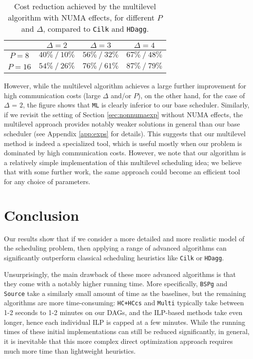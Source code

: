 \documentclass[sigconf,nonacm]{acmart}
\begin{document}
\begin{table}[t]
\centering
\caption{Cost reduction achieved by the multilevel algorithm with NUMA effects, for different $P$ and $\Delta$, compared to \texttt{Cilk} and \texttt{HDagg}.}
\renewcommand{\arraystretch}{1.65}
\begin{tabular}{c || c | c | c|}
  & $\Delta=2$ & $\Delta=3$ & $\Delta=4$ \\ [0.5ex] 
 \hline\hline
 $P=8$ & $40\% \: / \: 10\%$ & $56\% \: / \: 32\%$ & $67\% \: / \: 48\%$ \\
 \hline
 $P=16$ & $54\% \: / \: 26\%$ & $76\% \: / \: 61\%$ & $87\% \: / \: 79\%$ \\
 \hline
\end{tabular}
\label{tab:multi_small}
\end{table}

However, while the multilevel algorithm achieves a large further improvement for high communication costs (large $\Delta$ and/or $P$), on the other hand, for the case of $\Delta_{\!}=_{\!}2$, the figure shows that \texttt{ML} is clearly inferior to our base scheduler. Similarly, if we revisit the setting of Section \ref{sec:nonnumaexp} without NUMA effects, the multilevel approach provides notably weaker solutions in general than our base scheduler (see Appendix \ref{app:exps} for details). This suggests that our multilevel method is indeed a specialized tool, which is useful mostly when our problem is dominated by high communication costs. However, we note that our algorithm is a relatively simple implementation of this multilevel scheduling idea; we believe that with some further work, the same approach could become an efficient tool for any choice of parameters.

\section{Conclusion}

Our results show that if we consider a more detailed and more realistic model of the scheduling problem, then applying a range of advanced algorithms can significantly outperform classical scheduling heuristics like \texttt{Cilk} or \texttt{HDagg}.

Unsurprisingly, the main drawback of these more advanced algorithms is that they come with a notably higher running time. More specifically, \texttt{BSPg} and \texttt{Source} take a similarly small amount of time as the baselines, but the remaining algorithms are more time-consuming: \texttt{HC+HCcs} and \texttt{Multi} typically take between 1-2 seconds to 1-2 minutes on our DAGs, and the ILP-based methods take even longer, hence each individual ILP is capped at a few minutes. While the running times of these initial implementations can still be reduced significantly, in general, it is inevitable that this more complex direct optimization approach requires much more time than lightweight heuristics.
\end{document}
